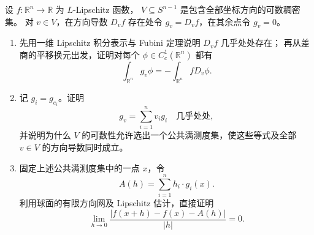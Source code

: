 \begin{exercise}
\label{b1:ex:16-rademacher-interfaces}
设 \(f:\mathbb R^n\to\mathbb R\) 为 \(L\)-Lipschitz 函数，
\(V\subseteq S^{n-1}\) 是包含全部坐标方向的可数稠密集。
对 \(v\in V\)，在方向导数 \(D_vf\) 存在处令 \(g_v=D_vf\)，在其余点令 \(g_v=0\)。
\begin{enumerate}
\item\label{b1:item:16-rademacher-test}
先用一维 Lipschitz 积分表示与 Fubini 定理说明 \(D_vf\) 几乎处处存在；
再从差商的平移换元出发，证明对每个 \(\phi\in C_c^1(\mathbb R^n)\) 都有
\[
 \int_{\mathbb R^n}g_v\phi
 =-\int_{\mathbb R^n}fD_v\phi.
\]
\item\label{b1:item:16-rademacher-linearity}
记 \(g_i=g_{e_i}\)。证明
\[
 g_v=\sum_{i=1}^n v_i g_i
 \quad\text{几乎处处},
\]
并说明为什么 \(V\) 的可数性允许选出一个公共满测度集，使这些等式及全部 \(v\in V\) 的方向导数同时成立。
\item\label{b1:item:16-rademacher-net}
固定上述公共满测度集中的一点 \(x\)，令
\[
 A(h)=\sum_{i=1}^n h_i\cdot g_i(x).
\]
利用球面的有限方向网及 Lipschitz 估计，直接证明
\[
 \lim_{h\to0}\frac{|f(x+h)-f(x)-A(h)|}{|h|}=0.
\]
\end{enumerate}
\end{exercise}
